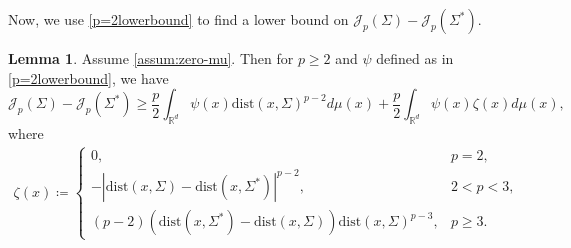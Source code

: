 \documentclass[preprint, reqno]{amsart}
\newcommand{\dist}{\mathrm{dist}}
\theoremstyle{definition}
\newtheorem{lemma}[definition]{Lemma}
\numberwithin{equation}{section}
\begin{document}
Now, we use \cref{p=2lowerbound} to find a lower bound on
$\mathscr{J}_p(\Sigma) - \mathscr{J}_p(\Sigma^*)$.
\begin{lemma}\label{lem:lower-bound-general}
  Assume \eqref{assum:zero-mu}. Then for $p \ge 2$ and $\psi$ defined
  as in \cref{p=2lowerbound}, we have
  \begin{equation}\label{equationlb}
    \mathscr{J}_p(\Sigma) - \mathscr{J}_p(\Sigma^*) \geq
    \frac{p}{2}\int_{\mathbb{R}^d}\psi(x)\dist(x, \Sigma)^{p-2}
    d\mu(x) + \frac{p}{2}\int_{\mathbb{R}^d}\psi(x)\zeta(x)d\mu(x),
  \end{equation}
  where
  \begin{align*}
    \zeta(x) \coloneqq
    \begin{cases}
      0,
      & p =2, \\
      -|\dist(x, \Sigma) - \dist(x, \Sigma^*)|^{p-2},
      & 2 < p < 3, \\
      (p-2)(\dist(x, \Sigma^*) - \dist(x, \Sigma)) \dist(x,
      \Sigma)^{p-3},
      & p \geq 3.
    \end{cases}
  \end{align*}
\end{lemma}
\end{document}
